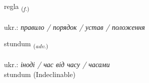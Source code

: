\documentclass[frontgrid, backgrid]{flacards}\usepackage[]{graphicx}\usepackage[]{xcolor}
\begin{document}
\renewcommand{\flhead}{\vskip5pt \fboxsep=0pt {\small\bfseries\footnotesize Nafnorð | іменник}}
\renewcommand{\fcfoot}{\vskip5pt \fboxsep=0pt \hspace{2pt}{\small\bfseries\footnotesize 1K}}

\renewcommand{\blhead}{\vskip5pt {\small\bfseries\footnotesize Nafnorð | іменник }}
\renewcommand{\bcfoot}{\vskip5pt \hspace{2pt}{\small\bfseries\footnotesize 1K}}


{regla \small{\textsubscript{(\textit{f.})}} \\[1ex] %
\textphonetic{[rɛkla]} \\
ukr.: \emph{правило / порядок / устав / положення} \\  [2ex]
\renewcommand*{\arraystretch}{0.8}
}


\renewcommand{\flhead}{\vskip5pt \fboxsep=0pt {\small\bfseries\footnotesize Atviksorð | прислівник}}
\renewcommand{\fcfoot}{\vskip5pt \fboxsep=0pt \hspace{2pt}{\small\bfseries\footnotesize 1K}}

\renewcommand{\blhead}{\vskip5pt {\small\bfseries\footnotesize Atviksorð | прислівник }}
\renewcommand{\bcfoot}{\vskip5pt \hspace{2pt}{\small\bfseries\footnotesize 1K}}


{stundum \small{\textsubscript{(\textit{adv.})}} \\[1ex]
\textphonetic{[stʏntʏm]} \\
ukr.: \emph{іноді / час від часу / часами} \\  [2ex]
stundum (Indeclinable)}

\renewcommand{\flhead}{\vskip5pt \fboxsep=0pt {\small\bfseries\footnotesize Nafnorð | іменник}}
\renewcommand{\fcfoot}{\vskip5pt \fboxsep=0pt \hspace{2pt}{\small\bfseries\footnotesize 1K}}
\end{document}
